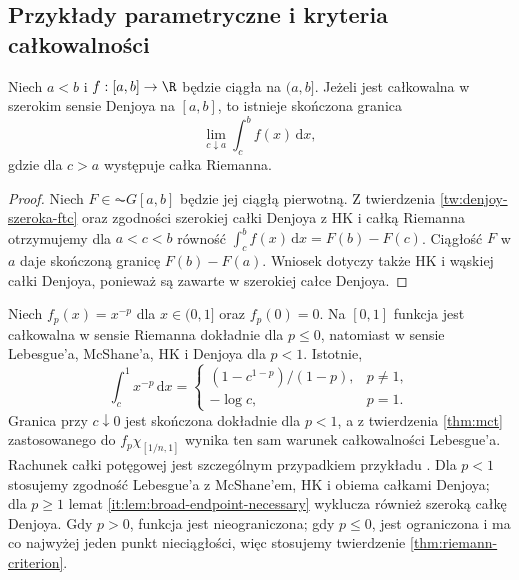 \subsection{Przykłady parametryczne i kryteria całkowalności}
\begin{lemat}\label{it:lem:broad-endpoint-necessary}
Niech $a<b$ i $f:[a,b]\to\R$ będzie ciągła na $(a,b]$. Jeżeli jest całkowalna w szerokim sensie Denjoya na $[a,b]$, to istnieje skończona granica
\[
 \lim_{c\downarrow a}\int_c^b f(x)\,\mathrm dx,
\]
gdzie dla $c>a$ występuje całka Riemanna.
\end{lemat}
\begin{proof}
Niech $F\in\AC G[a,b]$ będzie jej ciągłą pierwotną. Z twierdzenia \ref{tw:denjoy-szeroka-ftc} oraz zgodności szerokiej całki Denjoya z HK i całką Riemanna otrzymujemy dla $a<c<b$ równość $\int_c^b f(x)\,\mathrm dx=F(b)-F(c)$. Ciągłość $F$ w $a$ daje skończoną granicę $F(b)-F(a)$. Wniosek dotyczy także HK i wąskiej całki Denjoya, ponieważ są zawarte w szerokiej całce Denjoya.
\end{proof}
\begin{przyklad}
Niech $f_p(x)=x^{-p}$ dla $x\in(0,1]$ oraz $f_p(0)=0$. Na $[0,1]$ funkcja jest całkowalna w sensie Riemanna dokładnie dla $p\le0$, natomiast w sensie Lebesgue'a, McShane'a, HK i Denjoya dla $p<1$. Istotnie,
\[
\int_c^1x^{-p}\,\mathrm dx=\begin{cases}(1-c^{1-p})/(1-p),&p\ne1,\\-\log c,&p=1.\end{cases}
\]
Granica przy $c\downarrow0$ jest skończona dokładnie dla $p<1$, a z twierdzenia \ref{thm:mct} zastosowanego do $f_p\chi_{[1/n,1]}$ wynika ten sam warunek całkowalności Lebesgue'a. Rachunek całki potęgowej jest szczególnym przypadkiem przykładu . Dla $p<1$ stosujemy zgodność Lebesgue'a z McShane'em, HK i obiema całkami Denjoya; dla $p\ge1$ lemat \ref{it:lem:broad-endpoint-necessary} wyklucza również szeroką całkę Denjoya. Gdy $p>0$, funkcja jest nieograniczona; gdy $p\le0$, jest ograniczona i ma co najwyżej jeden punkt nieciągłości, więc stosujemy twierdzenie \ref{thm:riemann-criterion}.
\end{przyklad}
